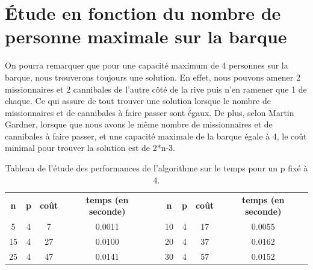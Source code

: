 \documentclass[a4paper, 12pt, french, oneside]{book}
\begin{document}
\section{Étude en fonction du nombre de personne maximale sur la barque}
On pourra remarquer que pour une capacité maximum de 4 personnes sur la barque, nous trouverons toujours une solution. En effet, nous pouvons amener 2 missionnaires et 2 cannibales de l'autre côté de la rive puis n'en ramener que 1 de chaque. Ce qui assure de tout trouver une solution lorsque le nombre de missionnaires et de cannibales à faire passer sont égaux. De plus, selon Martin Gardner, lorsque que nous avons le même nombre de missionnaires et de cannibales à faire passer, et une capacité maximale de la barque égale à 4, le coût minimal pour trouver la solution est de 2*n-3.
\begin{table}[!ht]
    \caption{Tableau de l'étude des performances de l'algorithme sur le temps pour un p fixé à 4. }
    \renewcommand\arraystretch{1.2}
    \begin{tabularx}{\linewidth}{|c|c|c|c|X|c|c|c|c|}
        \cline{1-4}\cline{6-9}
        {\textbf{n}} & {\textbf{p}} & {\textbf{coût}} & {\textbf{temps (en seconde)}} &  & {\textbf{n}} & {\textbf{p}} & {\textbf{coût}} & {\textbf{temps (en seconde)}} \\
        \cline{1-4}\cline{6-9}


        5            & 4            & 7               & 0.0011                        &  &

        10           & 4            & 17              & 0.0055                                                                                                           \\

        15           & 4            & 27              & 0.0100                        &  &

        20           & 4            & 37              & 0.0162                                                                                                           \\

        25           & 4            & 47              & 0.0141                        &  &

        30           & 4            & 57              & 0.0152                                                                                                           \\


\end{tabularx}
\end{table}
\end{document}
